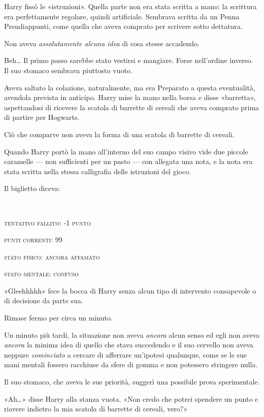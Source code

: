 Harry fissò le «istruzioni». Quella parte non era stata scritta a mano: la scrittura era perfettamente regolare, quindi artificiale. Sembrava scritta da un Penna Prendiappunti, come quella che aveva comprato per scrivere sotto dettatura.

Non aveva \textit{assolutamente alcuna idea} di cosa stesse accadendo.

Beh… Il primo passo sarebbe stato vestirsi e mangiare. Forse nell’ordine inverso. Il suo stomaco sembrava piuttosto vuoto.

Aveva saltato la colazione, naturalmente, ma era Preparato a questa eventualità, avendola prevista in anticipo. Harry mise la mano nella borsa e disse «barretta», aspettandosi di ricevere la scatola di barrette di cereali che aveva comprato prima di partire per Hogwarts.

Ciò che comparve non aveva la forma di una scatola di barrette di cereali.

Quando Harry portò la mano all’interno del suo campo visivo vide due piccole caramelle — non sufficienti per un pasto — con allegata una nota, e la nota era stata scritta nella stessa calligrafia delle istruzioni del gioco.

Il biglietto diceva:

\begin{addmargin}[3em]{3em}%
~

\textsc{tentativo fallito: -1 punto}

\textsc{punti correnti: 99}

\textsc{stato fisico: ancora affamato}

\textsc{stato mentale: confuso}\\
\end{addmargin}

«Gleehhhhh» fece la bocca di Harry senza alcun tipo di intervento consapevole o di decisione da parte sua.

Rimase fermo per circa un minuto.

Un minuto più tardi, la situazione non aveva \textit{ancora} alcun senso ed egli non aveva \textit{ancora} la minima idea di quello che stava succedendo e il suo cervello non aveva neppure \textit{cominciato} a cercare di afferrare un’ipotesi qualunque, come se le sue mani mentali fossero racchiuse da sfere di gomma e non potessero stringere nulla.

Il suo stomaco, che aveva le sue priorità, suggerì una possibile prova sperimentale.

«Ah…» disse Harry alla stanza vuota. «Non credo che potrei spendere un punto e riavere indietro la mia scatola di barrette di cereali, vero?»

